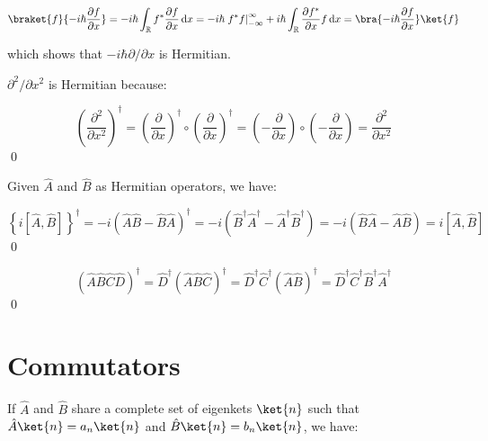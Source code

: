 \documentclass[12pt]{article}
\begin{document}
\begin{equation}
    \braket{f}{-i\hbar \frac{\partial f}{\partial x}} = -i\hbar \int_{\mathbb{R}} f^{*} \frac{\partial f}{\partial x} \, \mathrm{d}x = -i\hbar \left. f^{*} f \right|_{-\infty}^{\infty} + i\hbar \int_{\mathbb{R}} \frac{\partial f^{*}}{\partial x} f \, \mathrm{d}x = \bra{-i\hbar \frac{\partial f}{\partial x}} \ket{f}
\end{equation}

which shows that $-i\hbar \partial /\partial x$ is Hermitian.

$\partial^{2}/\partial x^{2}$ is Hermitian because:

\begin{equation}
    \left( \frac{\partial^{2}}{\partial x^{2}} \right)^{\dagger} = \left( \frac{\partial}{\partial x} \right)^{\dagger} \circ \left( \frac{\partial}{\partial x} \right)^{\dagger} = \left( - \frac{\partial}{\partial x} \right) \circ \left( - \frac{\partial}{\partial x} \right) = \frac{\partial^{2}}{\partial x^{2}}
\end{equation}
\qed


Given $\hat{A}$ and $\hat{B}$ as Hermitian operators, we have:

\begin{equation}
    \left\{ i \left[ \hat{A}, \hat{B} \right] \right\}^{\dagger} = -i \left( \hat{A} \hat{B} - \hat{B} \hat{A} \right)^{\dagger} = -i \left( \hat{B}^{\dagger} \hat{A}^{\dagger} - \hat{A}^{\dagger} \hat{B}^{\dagger} \right) = -i \left( \hat{B} \hat{A} - \hat{A} \hat{B} \right) = i \left[ \hat{A}, \hat{B} \right]
\end{equation}
\qed



\begin{equation}
    \left( \hat{A} \hat{B} \hat{C} \hat{D} \right)^{\dagger} = \hat{D}^{\dagger} \left( \hat{A} \hat{B} \hat{C} \right)^{\dagger} = \hat{D}^{\dagger} \hat{C}^{\dagger} \left( \hat{A} \hat{B} \right)^{\dagger} = \hat{D}^{\dagger} \hat{C}^{\dagger} \hat{B}^{\dagger} \hat{A}^{\dagger}
\end{equation}
\qed


\pagebreak
\section*{Commutators}


If $\hat{A}$ and $\hat{B}$ share a complete set of eigenkets $\ket{n}$ such that $\hat{A} \ket{n} = a_{n} \ket{n}$ and $\hat{B} \ket{n} = b_{n} \ket{n}$, we have:
\end{document}

